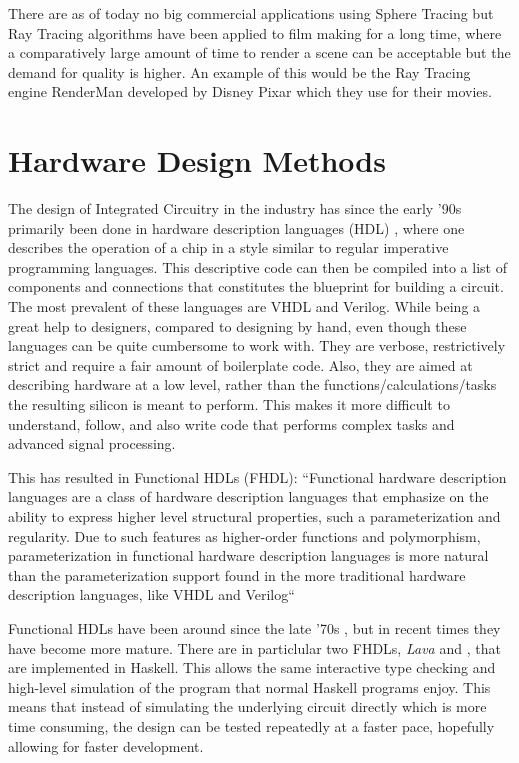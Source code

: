 		There are as of today no big commercial applications using Sphere
		Tracing but Ray Tracing algorithms have been applied to film making for
		a long time\cite{TODO}, where a comparatively large amount of time to
		render a scene can be acceptable but the demand for quality is higher.
		An example of this would be the Ray Tracing engine RenderMan developed
		by Disney Pixar which they use for their movies.\cite{TODO}
	
	\section{ Hardware Design Methods } 
	
		The design of Integrated Circuitry in the industry has since the early
		'90s primarily been done in hardware description languages (HDL)
		\cite{Chen2012}, where one describes the operation of a chip in a style
		similar to regular imperative programming languages. This descriptive
		code can then be compiled into a list of components and connections
		that constitutes the blueprint for building a circuit. The most
		prevalent of these languages are VHDL and Verilog\cite{TODO}. While
		being a great help to designers\cite{TODO}, compared to designing by hand, 
		even though these languages can be quite cumbersome to work with. They are verbose,
		restrictively strict and require a fair amount of boilerplate code.
		Also, they are aimed at describing hardware at a low level, rather than
		the functions/calculations/tasks the resulting silicon is meant to
		perform\cite{TODO}.  This makes it more difficult to understand, follow, and also
		write code that performs complex tasks and advanced signal processing\cite{TODO}.
		
		This has resulted in Functional HDLs (FHDL): ``Functional hardware
		description languages are a class of hardware description languages
		that emphasize on the ability to express higher level structural
		properties, such a parameterization and regularity. Due to such
		features as higher-order functions and polymorphism, parameterization
		in functional hardware description languages is more natural than the
		parameterization support found in the more traditional hardware
		description languages, like VHDL and Verilog`` \cite{Baaij2009}
		
		Functional HDLs have been around since the late '70s \cite{Chen2012},
		but in recent times they have become more mature. There are in
		particlular two FHDLs, \emph{Lava} and \clash \cite{Baaij2009,
		Bjesse1998}, that are implemented in Haskell.  This allows the same
		interactive type checking and high-level simulation of the program that
		normal Haskell programs enjoy. This means that instead of simulating
		the underlying circuit directly which is more time consuming, the
		design can be tested repeatedly at a faster pace, hopefully
		allowing for faster development.
